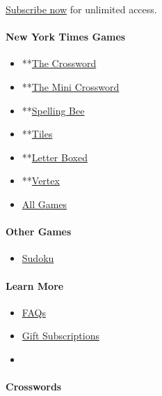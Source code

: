 \href{https://www.nytimes3xbfgragh.onion/subscription/games?campaignId=9W9LL}{Subscribe
now} for unlimited access.

\hypertarget{new-york-times-games-1}{%
\paragraph{New York Times Games}\label{new-york-times-games-1}}

\begin{itemize}
\tightlist
\item
  **\href{/crosswords/game/daily}{The Crossword}
\item
  **\href{/crosswords/game/mini}{The Mini Crossword}
\item
  **\href{/puzzles/spelling-bee}{Spelling Bee}
\item
  **\href{/puzzles/tiles}{Tiles}
\item
  **\href{/puzzles/letter-boxed}{Letter Boxed}
\item
  **\href{/puzzles/vertex}{Vertex}
\item
  \href{/crosswords}{All Games}
\end{itemize}

\hypertarget{other-games-1}{%
\paragraph{Other Games}\label{other-games-1}}

\begin{itemize}
\tightlist
\item
  \href{/puzzles/sudoku}{Sudoku}
\end{itemize}

\hypertarget{learn-more}{%
\paragraph{Learn More}\label{learn-more}}

\begin{itemize}
\item
  \href{https://nytimes3xbfgragh.onion/content/help/games/crosswords/crosswords.html}{FAQs}
\item
  \href{https://nytimes3xbfgragh.onion/subscription/games/lp3HLK7.html}{Gift
  Subscriptions}
\item
\end{itemize}

\hypertarget{crosswords}{%
\paragraph{Crosswords}\label{crosswords}}

